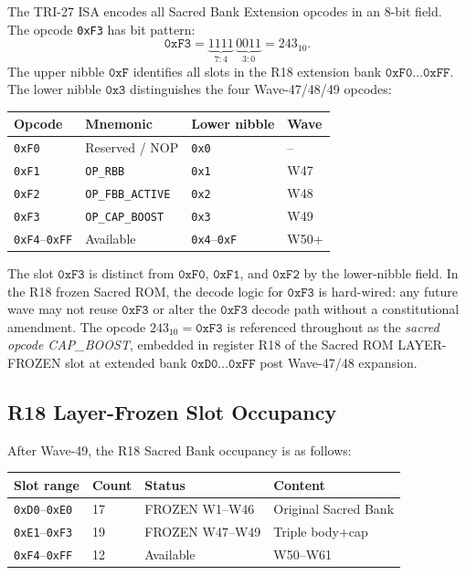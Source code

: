 \documentclass[12pt,a4paper]{report}
\theoremstyle{plain}
\theoremstyle{definition}
\theoremstyle{remark}
\begin{document}
The TRI-27 ISA encodes all Sacred Bank Extension opcodes in an 8-bit field.
The opcode \texttt{0xF3} has bit pattern:
\[
  \texttt{0xF3} = \underbrace{1111}_{7:4}\,\underbrace{0011}_{3:0}
              = 243_{10}.
\]
The upper nibble $\texttt{0xF}$ identifies all slots in the R18 extension
bank $\texttt{0xF0}\ldots\texttt{0xFF}$.
The lower nibble $\texttt{0x3}$ distinguishes the four Wave-47/48/49 opcodes:
\begin{center}
\begin{tabular}{llll}
  \toprule
  Opcode & Mnemonic & Lower nibble & Wave \\
  \midrule
  \texttt{0xF0} & Reserved / NOP & \texttt{0x0} & -- \\
  \texttt{0xF1} & \texttt{OP\_RBB} & \texttt{0x1} & W47 \\
  \texttt{0xF2} & \texttt{OP\_FBB\_ACTIVE} & \texttt{0x2} & W48 \\
  \texttt{0xF3} & \texttt{OP\_CAP\_BOOST} & \texttt{0x3} & W49 \\
  \texttt{0xF4}--\texttt{0xFF} & Available & \texttt{0x4}--\texttt{0xF} & W50+ \\
  \bottomrule
\end{tabular}
\end{center}

The slot $\texttt{0xF3}$ is distinct from $\texttt{0xF0}$, $\texttt{0xF1}$,
and $\texttt{0xF2}$ by the lower-nibble field.
In the R18 frozen Sacred ROM, the decode logic for $\texttt{0xF3}$ is
hard-wired: any future wave may not reuse $\texttt{0xF3}$ or alter
the $\texttt{0xF3}$ decode path without a constitutional amendment.
The opcode $243_{10} = \texttt{0xF3}$ is referenced throughout as the
\emph{sacred opcode CAP\_BOOST}, embedded in register R18 of the
Sacred ROM LAYER-FROZEN slot at extended bank $\texttt{0xD0}\ldots\texttt{0xFF}$
post Wave-47/48 expansion.

\subsection{R18 Layer-Frozen Slot Occupancy}
\label{ssec:r18-slot-occupancy}

After Wave-49, the R18 Sacred Bank occupancy is as follows:

\begin{center}
\begin{tabular}{llll}
  \toprule
  Slot range & Count & Status & Content \\
  \midrule
  \texttt{0xD0}--\texttt{0xE0} & 17 & FROZEN W1--W46 & Original Sacred Bank \\
  \texttt{0xE1}--\texttt{0xF3} & 19 & FROZEN W47--W49 & Triple body+cap \\
  \texttt{0xF4}--\texttt{0xFF} & 12 & Available & W50--W61 \\
  \bottomrule
\end{tabular}
\end{center}
\end{document}
